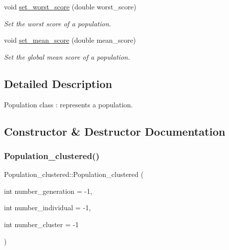 \begin{DoxyCompactItemize}
void \hyperlink{class_population__clustered_a30378ce62362cd7ec929af2e66018a98}{set\+\_\+worst\+\_\+score} (double worst\+\_\+score)
\begin{DoxyCompactList}\small\item\em Set the worst score of a population. \end{DoxyCompactList}\item 
void \hyperlink{class_population__clustered_a234c028b57507ac9b4c81273a8279b01}{set\+\_\+mean\+\_\+score} (double mean\+\_\+score)
\begin{DoxyCompactList}\small\item\em Set the global mean score of a population. \end{DoxyCompactList}\end{DoxyCompactItemize}


\subsection{Detailed Description}
Population class \+: represents a population. 

\subsection{Constructor \& Destructor Documentation}
\mbox{\label{class_population__clustered_a53e9a4efeb00daff22df130e1db05b2e}} 
\subsubsection{\texorpdfstring{Population\+\_\+clustered()}{Population\_clustered()}\hspace{0.1cm}{\footnotesize\ttfamily [1/2]}}
{\footnotesize\ttfamily Population\+\_\+clustered\+::\+Population\+\_\+clustered (\begin{DoxyParamCaption}\item[{int}]{number\+\_\+generation = {\ttfamily -\/1},  }\item[{int}]{number\+\_\+individual = {\ttfamily -\/1},  }\item[{int}]{number\+\_\+cluster = {\ttfamily -\/1} }\end{DoxyParamCaption})}



